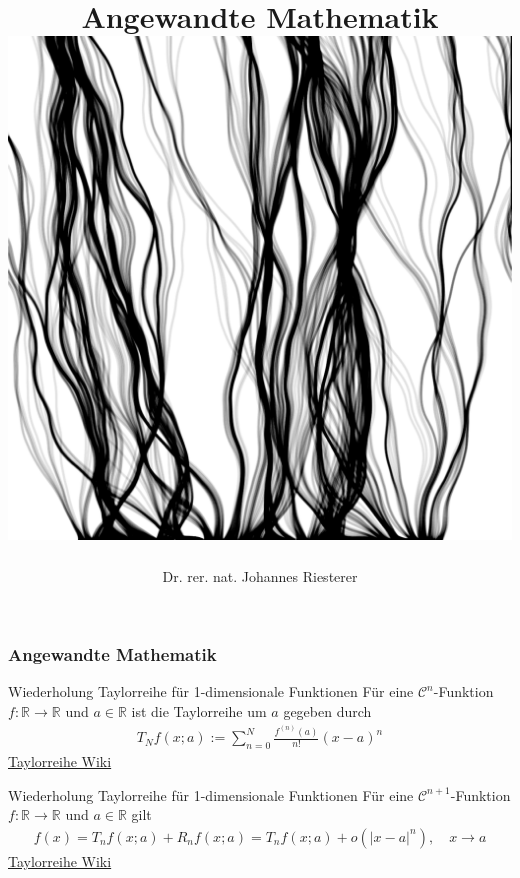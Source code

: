 \documentclass{beamer}
\begin{document}
\title[Angewandte Mathematik] %
{Angewandte Mathematik
\\
\includegraphics[scale=0.15]{images/cover}
}
\subtitle{}
\author[Dr. Johannes Riesterer] %
{Dr.  rer. nat. Johannes Riesterer}

\date[KPT 2004] %
{}

\subject{Angewandte Mathematik}



\frame{\titlepage}

\begin{frame}
    \frametitle{Angewandte Mathematik}
    \begin{block}{Wiederholung Taylorreihe für 1-dimensionale Funktionen}
        Für eine $\mathcal{C}^{n}$-Funktion $f: \mathbb{R} \to \mathbb{R}$ und $a \in \mathbb{R}$ ist die Taylorreihe um $a$ gegeben durch
    \begin{align*}
        T_N f(x;a) := \sum_{n=0}^N \frac{f^{(n)}(a)}{n!} (x-a)^n
    \end{align*}
    \href{https://de.wikipedia.org/wiki/Taylorreihe}{Taylorreihe Wiki}
    \end{block}

    \begin{block}{Wiederholung Taylorreihe für 1-dimensionale Funktionen}
        Für eine $\mathcal{C}^{n+1}$-Funktion $f: \mathbb{R} \to \mathbb{R}$ und $a \in \mathbb{R}$ gilt
    \begin{align*}
        f(x) = T_n f(x; a) + R_n f(x; a) = T_n f(x; a) + o(|x - a|^n), \quad x\rightarrow a
    \end{align*}
    \href{https://de.wikipedia.org/wiki/Taylor-Formel}{Taylorreihe Wiki}
    \end{block}
\end{frame}
\end{document}
